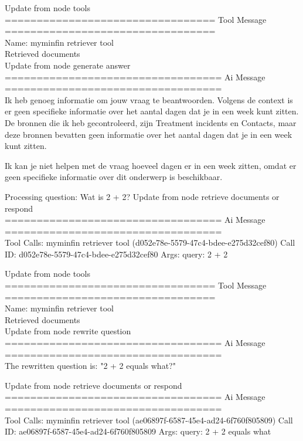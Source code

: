 Update from node tools
\\[1em]
================================= Tool Message =================================
\\[1em]
Name: myminfin  retriever  tool
\\[1em]
Retrieved documents
\\[1em]
Update from node generate  answer
\\[1em]
================================== Ai Message ==================================
\\[1em]

Ik heb genoeg informatie om jouw vraag te beantwoorden. Volgens de context is er geen specifieke informatie over het aantal dagen dat je in een week kunt zitten. De bronnen die ik heb gecontroleerd, zijn Treatment  incidents en Contacts, maar deze bronnen bevatten geen informatie over het aantal dagen dat je in een week kunt zitten.

Ik kan je niet helpen met de vraag hoeveel dagen er in een week zitten, omdat er geen specifieke informatie over dit onderwerp is beschikbaar.



Processing question: Wat is 2 + 2?
Update from node retrieve  documents  or  respond
\\[1em]
================================== Ai Message ==================================
\\[1em]
Tool Calls:
myminfin  retriever  tool (d052e78e-5579-47c4-bdee-e275d32cef80)
Call ID: d052e78e-5579-47c4-bdee-e275d32cef80
Args:
query: 2 + 2



Update from node tools
\\[1em]
================================= Tool Message =================================
\\[1em]
Name: myminfin  retriever  tool
\\[1em]
Retrieved documents
\\[1em]


Update from node rewrite  question
\\[1em]
================================== Ai Message ==================================
\\[1em]

The rewritten question is:
"2 + 2 equals what?"



Update from node retrieve  documents  or  respond
\\[1em]
================================== Ai Message ==================================
\\[1em]
Tool Calls:
myminfin  retriever  tool (ae06897f-6587-45e4-ad24-6f760f805809)
Call ID: ae06897f-6587-45e4-ad24-6f760f805809
Args:
query: 2 + 2 equals what




